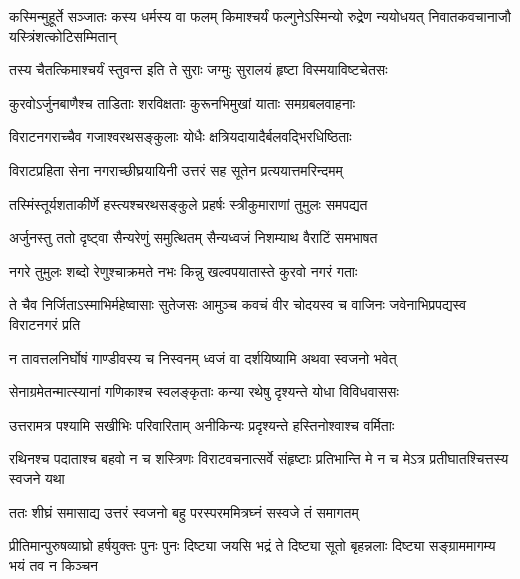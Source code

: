 \onelineshloka
{कस्मिन्मुहूर्ते सञ्जातः कस्य धर्मस्य वा फलम्}
\twolineshloka
{किमाश्चर्यं फल्गुनेऽस्मिन्यो रुद्रेण न्ययोधयत्}
{निवातकवचानाजौ यस्त्रिंशत्कोटिसम्मितान्}


\twolineshloka
{तस्य चैतत्किमाश्चर्यं स्तुवन्त इति ते सुराः}
{जग्मुः सुरालयं हृष्टा विस्मयाविष्टचेतसः}


\twolineshloka
{कुरवोऽर्जुनबाणैश्च ताडिताः शरविक्षताः}
{कुरूनभिमुखां याताः समग्रबलवाहनाः}


\twolineshloka
{विराटनगराच्चैव गजाश्वरथसङ्कुलाः}
{योधैः क्षत्रियदायादैर्बलवद्भिरधिष्ठिताः}


\twolineshloka
{विराटप्रहिता सेना नगराच्छीघ्रयायिनी}
{उत्तरं सह सूतेन प्रत्ययात्तमरिन्दमम्}


\twolineshloka
{तस्मिंस्तूर्यशताकीर्णे हस्त्यश्चरथसङ्कुले}
{प्रहर्षः स्त्रीकुमाराणां तुमुलः समपद्यत}


\twolineshloka
{अर्जुनस्तु ततो दृष्ट्वा सैन्यरेणुं समुत्थितम्}
{सैन्यध्वजं निशम्याथ वैराटिं समभाषत}


\twolineshloka
{नगरे तुमुलः शब्दो रेणुश्चाक्रमते नभः}
{किन्नु खल्वपयातास्ते कुरवो नगरं गताः}


\threelineshloka
{ते चैव निर्जिताऽस्माभिर्महेष्वासाः सुतेजसः}
{आमुञ्च कवचं वीर चोदयस्व च वाजिनः}
{जवेनाभिप्रपद्यस्व विराटनगरं प्रति}


\twolineshloka
{न तावत्तलनिर्घोषं गाण्डीवस्य च निस्वनम्}
{ध्वजं वा दर्शयिष्यामि अथवा स्वजनो भवेत्}




\twolineshloka
{सेनाग्रमेतन्मात्स्यानां गणिकाश्च स्वलङ्कृताः}
{कन्या रथेषु दृश्यन्ते योधा विविधवाससः}


\twolineshloka
{उत्तरामत्र पश्यामि सखीभिः परिवारिताम्}
{अनीकिन्यः प्रदृश्यन्ते हस्तिनोश्वाश्च वर्मिताः}


\threelineshloka
{रथिनश्च पदाताश्च बहवो न च शस्त्रिणः}
{विराटवचनात्सर्वे संहृष्टाः प्रतिभान्ति मे}
{न च मेऽत्र प्रतीघातश्चित्तस्य स्वजने यथा}



\twolineshloka
{ततः शीघ्रं समासाद्य उत्तरं स्वजनो बहु}
{परस्परममित्रघ्नं सस्वजे तं समागतम्}




\threelineshloka
{प्रीतिमान्पुरुषव्याघ्रो हर्षयुक्तः पुनः पुनः}
{दिष्ट्या जयसि भद्रं ते दिष्ट्या सूतो बृहन्नलाः}
{दिष्ट्या सङ्ग्राममागम्य भयं तव न किञ्चन}




